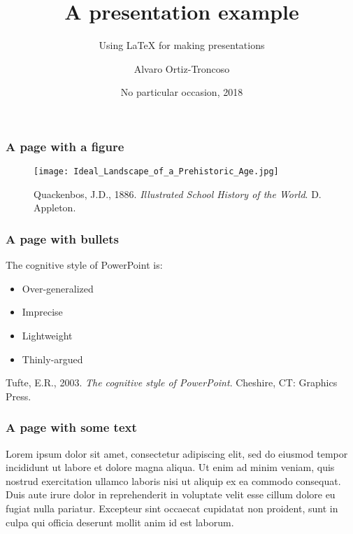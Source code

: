 % 


\title{A presentation example}
\subtitle{Using LaTeX for making presentations}
\author{Alvaro Ortiz-Troncoso}
\date{No particular occasion, 2018}
\subject{Templates and layout}



{
  {
  \frame{\titlepage}
  }
}
\addtocounter{framenumber}{-1}

\begin{frame}
  \frametitle{A page with a figure}
  \begin{figure}
    \texttt{[image: Ideal\_Landscape\_of\_a\_Prehistoric\_Age.jpg]}
    \caption{Quackenbos, J.D., 1886. \textit{Illustrated School History of the World}. D. Appleton.}
  \end{figure}
\end{frame}

\begin{frame}
  \frametitle{A page with bullets}
  The cognitive style of PowerPoint is:
  \begin{itemize}
  \item{Over-generalized}
  \item{Imprecise}
  \item{Lightweight}
  \item{Thinly-argued}
  \end{itemize}
  \bigskip
  \begin{center}\scriptsize{Tufte, E.R., 2003. \textit{The cognitive style of PowerPoint}. Cheshire, CT: Graphics Press.}\end{center}  
\end{frame}


{\scriptsize
\begin{frame}
  \frametitle{A page with some text}
Lorem ipsum dolor sit amet, consectetur adipiscing elit, sed do eiusmod tempor incididunt ut labore et dolore magna aliqua. Ut enim ad minim veniam, quis nostrud exercitation ullamco laboris nisi ut aliquip ex ea commodo consequat. Duis aute irure dolor in reprehenderit in voluptate velit esse cillum dolore eu fugiat nulla pariatur. Excepteur sint occaecat cupidatat non proident, sunt in culpa qui officia deserunt mollit anim id est laborum.
\end{frame}
}

